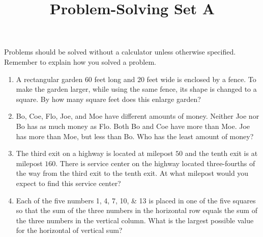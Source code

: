\documentclass{article}
\title{Problem-Solving Set A}
\author{}
\date{}
\begin{document}
\maketitle
\noindent Problems should be solved without a calculator unless otherwise specified.
Remember to explain how you solved a problem.
\begin{multicols}{2}
    \begin{enumerate}
        \item A rectangular garden $60$ feet long and $20$ feet wide is enclosed by a fence.
            To make the garden larger, while using the same fence, its shape is changed to a square.
            By how many square feet does this enlarge garden?
            \vspace{3cm}
        \item Bo, Coe, Flo, Joe, and Moe have different amounts of money.
            Neither Joe nor Bo has as much money as Flo.
            Both Bo and Coe have more than Moe.
            Joe has more than Moe, but less than Bo.
            Who has the least amount of money?
            \vspace{3cm}
        \item The third exit on a highway is located at milepost $50$ and the tenth exit is at milepost $160$.
            There is service center on the highway located three-fourths of the way from the third exit to the tenth exit.
            At what milepost would you expect to find this service center?
            \vspace{3cm}
        \item Each of the five numbers \numlist{1;4;7;10;13} is placed in one of the five squares so that the sum of the three numbers in the horizontal row equals the sum of the three numbers in the vertical column.
            What is the largest possible value for the horizontal of vertical sum?
            \begin{center}
\end{center}
\end{enumerate}
\end{multicols}
\end{document}
